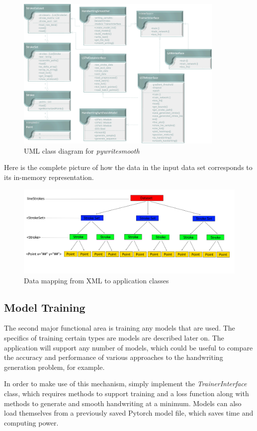 \documentclass{article}
\begin{document}
    \begin{figure}[hbt!]
        \includegraphics[width=10cm]{Classes}
        \centering
        \caption{UML class diagram for \emph{pywritesmooth}}
        \label{fig:uml}
    \end{figure}
    
Here is the complete picture of how the data in the input data set corresponds to its in-memory representation.

    \begin{figure}[hbt!]
        \includegraphics[width=12cm]{Dataset-Diagram}
        \centering
        \caption{Data mapping from XML to application classes}
        \label{fig:data-map}
    \end{figure}
    
\subsection{Model Training}
The second major functional area is training any models that are used. The specifics of training certain types are models are described later on. The application will support any number of models, which could be useful to compare the accuracy and performance of various approaches to the handwriting generation problem, for example.

In order to make use of this mechanism, simply implement the \textit{TrainerInterface} class, which requires methods to support training and a loss function along with methods to generate and smooth handwriting at a minimum. Models can also load themselves from a previously saved Pytorch model file, which saves time and computing power.
\end{document}
